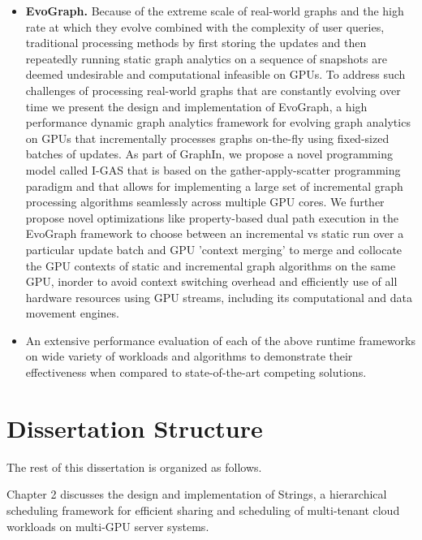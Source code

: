 \begin{itemize}
\item \textbf{EvoGraph.} Because of the extreme scale of real-world graphs and the high rate at which they evolve combined with the complexity of user queries, traditional processing methods by first storing the updates and then repeatedly running static graph analytics on a sequence of snapshots are deemed undesirable and computational infeasible on GPUs. To address such challenges of processing real-world graphs that are constantly evolving over time we present the design and implementation of EvoGraph, a high performance dynamic graph analytics framework for evolving graph analytics on GPUs that incrementally processes graphs on-the-fly using fixed-sized batches of updates.    As part of GraphIn, we propose a novel programming model called I-GAS that is based on the gather-apply-scatter programming paradigm and that allows for implementing a large set of incremental graph processing algorithms seamlessly across multiple GPU cores.  We further propose novel optimizations like property-based dual path execution in the EvoGraph framework to choose between an incremental vs static run over a particular update batch and GPU 'context merging' to merge and collocate the GPU contexts of static and incremental graph algorithms on the same GPU, inorder to avoid context switching overhead and efficiently use of all hardware resources using GPU streams, including its computational and data movement engines.

\item An extensive performance evaluation of each of the above runtime frameworks on wide variety of workloads and algorithms to demonstrate their effectiveness when compared to state-of-the-art competing solutions. 

\end{itemize}

\section{Dissertation Structure}
The rest of this dissertation is organized as follows. 

Chapter 2 discusses the design and implementation of Strings, a hierarchical scheduling framework for efficient sharing
and scheduling of multi-tenant cloud workloads on multi-GPU server systems. 


